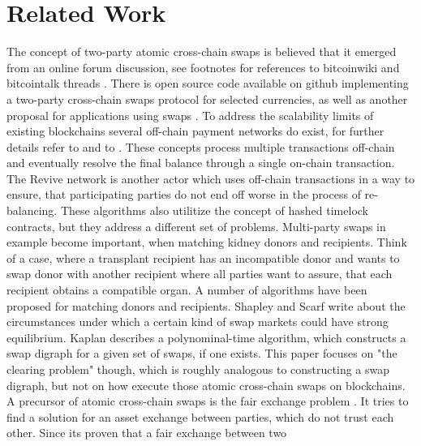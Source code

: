 \chapter{Related Work}
\label{ch:chapter03}

The concept of two-party atomic cross-chain swaps is believed that it emerged from an online forum discussion, see footnotes for references to bitcoinwiki and bitcointalk threads  . There is open source code available on github   implementing a two-party cross-chain swaps protocol for selected currencies, as well as another proposal for applications using swaps \cite{zyskind2018enigma}. To address the scalability limits of existing blockchains several off-chain payment networks do exist, for further details refer to  and to \cite{poon2016bitcoin} \cite{decker2015fast} \cite{green2017bolt}. These concepts process multiple transactions off-chain and eventually resolve the final balance through a single on-chain transaction. The Revive network \cite{khalil2017revive} is another actor which uses off-chain transactions in a way to ensure, that participating parties do not end off worse in the process of re-balancing. These algorithms also utilitize the concept of hashed timelock contracts, but they address a different set of problems. Multi-party swaps in example become important, when matching kidney donors and recipients. Think of a case, where a transplant recipient has an incompatible donor and wants to swap donor with another recipient where all parties want to assure, that each recipient obtains a compatible organ. A number of algorithms \cite{abraham2007clearing} \cite{dickerson2016position} \cite{jia2017efficient} have been proposed for matching donors and recipients. Shapley and Scarf \cite{shapley1974cores} write about the circumstances under which a certain kind of swap markets could have strong equilibrium. Kaplan \cite{kaplan2011improved} describes a polynominal-time algorithm, which constructs a swap digraph for a given set of swaps, if one exists. This paper focuses on "the clearing problem" though, which is roughly analogous to constructing a swap digraph, but not on how execute those atomic cross-chain swaps on blockchains. A precursor of atomic cross-chain swaps is the fair exchange problem \cite{franklin1998secure} \cite{micali2003simple}. It tries to find a solution for an asset exchange between parties, which do not trust each other. Since its proven that a fair exchange between two 